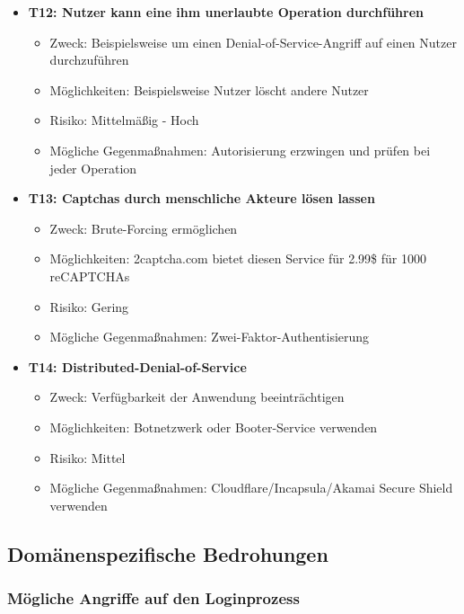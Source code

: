 \documentclass[12pt,DIV14,BCOR10mm,a4paper,parskip=half-,headsepline,headinclude,english,ngerman,bibliography=totocnumbered]{scrreprt}
\begin{document}
\begin{itemize}
  \hypertarget{threat12}{}
  \item \textbf{T12: Nutzer kann eine ihm unerlaubte Operation durchführen}
  \begin{itemize}
  \item Zweck: Beispielsweise um einen Denial-of-Service-Angriff auf einen Nutzer durchzuführen
  \item Möglichkeiten: Beispielsweise Nutzer löscht andere Nutzer
  \item Risiko: Mittelmäßig - Hoch
  \item Mögliche Gegenmaßnahmen: Autorisierung erzwingen und prüfen bei jeder Operation
  \end{itemize}

  \hypertarget{threat13}{}
  \item \textbf{T13: Captchas durch menschliche Akteure lösen lassen}
  \begin{itemize}
  \item Zweck: Brute-Forcing ermöglichen
  \item Möglichkeiten: 2captcha.com bietet diesen Service für 2.99\$ für 1000 reCAPTCHAs
  \item Risiko: Gering
  \item Mögliche Gegenmaßnahmen: Zwei-Faktor-Authentisierung
  \end{itemize}

  \hypertarget{threat14}{}
  \item \textbf{T14: Distributed-Denial-of-Service}
  \begin{itemize}
  \item Zweck: Verfügbarkeit der Anwendung beeinträchtigen
  \item Möglichkeiten: Botnetzwerk oder Booter-Service verwenden
  \item Risiko: Mittel
  \item Mögliche Gegenmaßnahmen: Cloudflare/Incapsula/Akamai Secure Shield verwenden
  \end{itemize}

\end{itemize}

\subsection{Domänenspezifische Bedrohungen}

\subsubsection{Mögliche Angriffe auf den Loginprozess}
\end{document}
